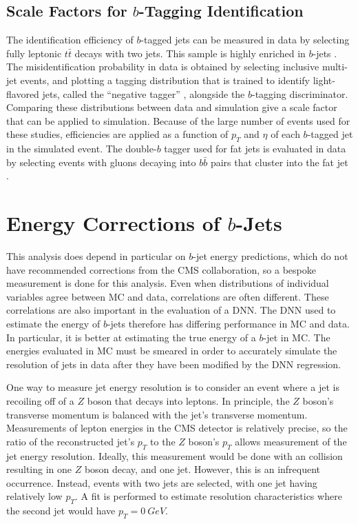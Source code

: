 \subsection{Scale Factors for $b$-Tagging Identification}

The identification efficiency of $b$-tagged jets can be measured in data by selecting
fully leptonic $t\bar{t}$ decays with two jets.
This sample is highly enriched in $b$-jets \cite{Sirunyan_2018}.
The misidentification probability in data is obtained by selecting inclusive multi-jet events,
and plotting a tagging distribution that is trained to identify light-flavored jets,
called the ``negative tagger'' \cite{collaboration_2013}, alongside the $b$-tagging discriminator.
Comparing these distributions between data and simulation give a scale factor that can be applied to simulation.
Because of the large number of events used for these studies, efficiencies are applied as a function of
$p_T$ and $\eta$ of each $b$-tagged jet in the simulated event.
The double-$b$ tagger used for fat jets is evaluated in data by
selecting events with gluons decaying into $b\bar{b}$ pairs that cluster into the fat jet \cite{scodellaro2017b}.

\section{Energy Corrections of $b$-Jets} \label{sec:bjet-energy-corr}

This analysis does depend in particular on $b$-jet energy predictions,
which do not have recommended corrections from the CMS collaboration,
so a bespoke measurement is done for this analysis.
Even when distributions of individual variables agree between MC and data,
correlations are often different.
These correlations are also important in the evaluation of a DNN.
The DNN used to estimate the energy of $b$-jets therefore has differing performance
in MC and data.
In particular, it is better at estimating the true energy of a $b$-jet in MC.
The energies evaluated in MC must be smeared in order to accurately simulate
the resolution of jets in data after they have been modified by the DNN regression.

One way to measure jet energy resolution is to consider an event
where a jet is recoiling off of a $Z$ boson that decays into leptons.
In principle, the $Z$ boson's transverse momentum is balanced with the
jet's transverse momentum.
Measurements of lepton energies in the CMS detector is relatively precise,
so the ratio of the reconstructed jet's
$p_T$ to the $Z$ boson's $p_T$ allows measurement of the jet energy resolution.
Ideally, this measurement would be done with an collision resulting in one $Z$ boson decay,
and one jet.
However, this is an infrequent occurrence.
Instead, events with two jets are selected, with one jet having relatively low $p_T$.
A fit is performed to estimate resolution characteristics
where the second jet would have $p_T = \SI{0}{GeV}$.

